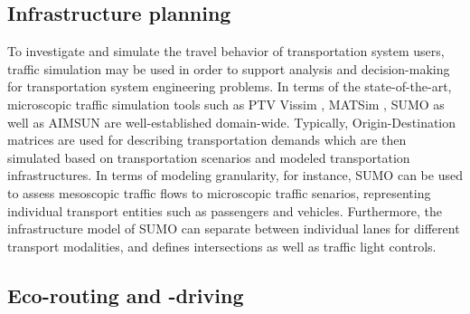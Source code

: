 \documentclass[a4paper,twoside]{article}
\begin{document}
%	
%
%	

	\subsection{Infrastructure planning}
\label{sec:infrastructure-planning}
	
	To investigate and simulate the travel behavior of transportation system users, traffic simulation may be used in order to support analysis and decision-making for transportation system engineering problems. In terms of the state-of-the-art, microscopic traffic simulation tools such as PTV Vissim \cite{fellendorf_vissim_1994}, MATSim \cite{w_axhausen_multi-agent_2016}, SUMO \cite{lopez_microscopic_2018} as well as AIMSUN \cite{barcelo2005dynamic} are well-established domain-wide. Typically, Origin-Destination matrices are used for describing transportation demands which are then simulated based on transportation scenarios and modeled transportation infrastructures. In terms of modeling granularity, for instance, SUMO \cite{lopez_microscopic_2018} can be used to assess mesoscopic traffic flows to microscopic traffic senarios, representing individual transport entities such as passengers and vehicles. Furthermore, the infrastructure model of SUMO can separate between individual lanes for different transport modalities, and defines intersections as well as traffic light controls. 
	

	\subsection{Eco-routing and -driving}
\label{sec:eco-routing}
\end{document}

